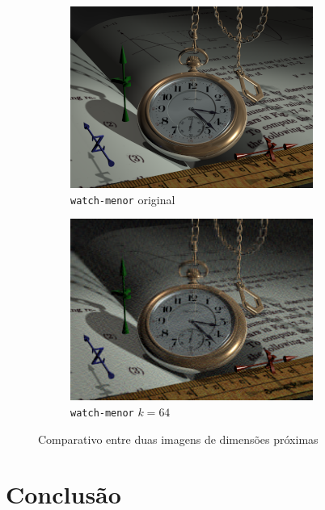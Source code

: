 \documentclass[brazilian,a4paper,twocolumn]{article}
\begin{document}
\begin{figure}[H]
        \begin{subfigure}{0.23\textwidth}
            \includegraphics[width=\textwidth,keepaspectratio]{watch-menor}
            \caption{\texttt{watch-menor} original}
            \label{fig:watch-menor-original}
        \end{subfigure}
        \begin{subfigure}{0.23\textwidth}
            \includegraphics[width=\textwidth,keepaspectratio]{watch-menor-64}
            \caption{\texttt{watch-menor} $k=64$}
            \label{fig:watch-menor-64}
        \end{subfigure}

        \caption{Comparativo entre duas imagens de dimensões próximas}
        \label{fig:comparativo-watch-monalisa}
    \end{figure}


\section{Conclusão}
\end{document}
